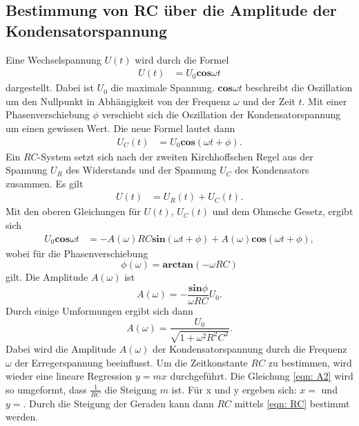 \subsection{Bestimmung von RC über die Amplitude der Kondensatorspannung}
Eine Wechselspannung $U(t)$ wird durch die Formel 
\begin{align*} 
    U(t)&= U_{0} \mathbf{cos}\omega t 
\end{align*}
dargestellt. Dabei ist $U_{0}$ die maximale Spannung. $\mathbf{cos}\omega t$ beschreibt die Oszillation um den Nullpunkt in Abhängigkeit von der Frequenz $\omega$ und der Zeit $t$. 
Mit einer Phasenverschiebung $\phi$ verschiebt sich die Oszillation der Kondensatorspannung um einen gewissen Wert. Die neue Formel lautet dann 
\begin{align*} 
    U_{C}(t)&= U_{0} \mathbf{cos}(\omega t + \phi).
\end{align*}
Ein $RC$-System setzt sich nach der zweiten Kirchhoffschen Regel aus der Spannung $U_{R}$ des Widerstands und der Spannung $U_{C}$ des Kondensators zusammen.
Es gilt 
\begin{align*} 
    U(t) &= U_{R}(t) + U_{C}(t).
\end{align*}
Mit den oberen Gleichungen für $U(t)$, $U_{C}(t)$ und dem Ohmsche Gesetz, ergibt sich 
\begin{align*} 
U_{0} \mathbf{cos}\omega t &= -A(\omega) RC \mathbf{sin}(\omega t + \phi) + A(\omega) \mathbf{cos}(\omega t + \phi),  
\end{align*}
wobei für die Phasenverschiebung 
\begin{equation} 
\phi (\omega) = \mathbf{arctan}(-\omega RC) 
\label{eqn: phi}
\end{equation}
gilt. Die Amplitude $A(\omega)$ ist
\begin{equation} 
    A(\omega) = - \frac{\mathbf{sin}\phi}{\omega RC} U_{0}.
    \label{eqn: A1}
\end{equation}
Durch einige Umformungen ergibt sich dann 
\begin{equation}
A(\omega) = \frac{U_{0}}{\sqrt{1 + \omega^2 R^2 C^2}}.
\label{eqn: A2}
\end{equation}
Dabei wird die Amplitude $A(\omega)$ der Kondensatorspannung durch die Frequenz $\omega$ der Erregerspannung beeinflusst.
Um die Zeitkonstante $RC$ zu bestimmen, wird wieder eine lineare Regression $y=mx$ durchgeführt. %
Die Gleichung \eqref{eqn: A2} wird so umgeformt, dass $\frac{1}{RC}$ die Steigung $m$ ist.
Für x und y ergeben sich: $x=$ und $y=$. %
Durch die Steigung der Geraden kann dann $RC$ mittels \eqref{eqn: RC} bestimmt werden.

